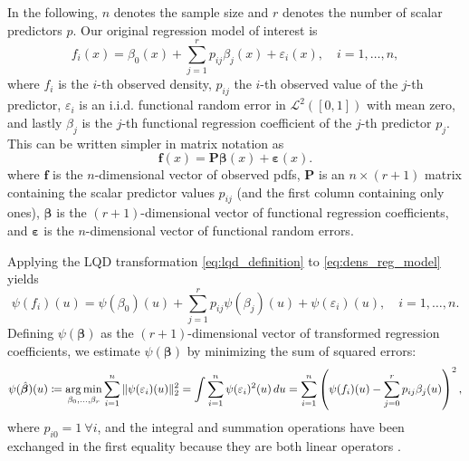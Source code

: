 In the following, $n$ denotes the sample size and $r$ denotes the number of scalar
predictors $p$. Our original regression model of interest is
\begin{equation}
    \label{eq:dens_reg_model}
    f_i(x) = \beta_0(x) + \sum_{j=1}^{r} p_{ij} \beta_j(x) + \varepsilon_i(x), \quad i = 1, \ldots, n,
\end{equation}
where $f_i$ is the $i$-th observed density, $p_{ij}$ the $i$-th observed value of the
$j$-th predictor, $\varepsilon_i$ is an i.i.d. functional random error in $\mathcal{L}^2([0,1])$
with mean zero, and lastly $\beta_j$ is the $j$-th functional regression coefficient of the $j$-th
predictor $p_j$. This can be written simpler in matrix notation as
\begin{equation}
    \label{eq:dens_reg_model_matrix}
    \mathbf{f}(x) = \mathbf{P} \boldsymbol{\beta}(x) + \boldsymbol{\varepsilon}(x).
\end{equation}
where $\mathbf{f}$ is the $n$-dimensional vector of observed pdfs, $\mathbf{P}$ is an $n \times (r+1)$
matrix containing the scalar predictor values $p_{ij}$ (and the first column containing only
ones), $\boldsymbol{\beta}$ is the $(r+1)$-dimensional vector of functional regression coefficients,
and $\boldsymbol{\varepsilon}$ is the $n$-dimensional vector of functional random errors.

Applying the LQD transformation \eqref{eq:lqd_definition} to \eqref{eq:dens_reg_model}
yields
\begin{equation}
    \label{eq:lqd_reg_model}
    \psi(f_i)(u) = \psi(\beta_0)(u) + \sum_{j=1}^{r} p_{ij} \psi(\beta_j)(u) + \psi(\varepsilon_i)(u), \quad i = 1, \ldots, n.
\end{equation}
Defining $\psi(\boldsymbol{\beta})$ as the $(r+1)$-dimensional vector of transformed
regression coefficients, we estimate $\psi(\boldsymbol{\beta})$ by minimizing the sum of
squared errors:
\begin{equation}
    \psi(\hat{\boldsymbol{\beta}})(u)
    \coloneqq \operatorname*{arg\,min}_{\beta_0,\dots, \beta_r} \sum_{i=1}^{n} \|\psi(\varepsilon_i) (u)\|_2^2
    = \int \sum_{i=1}^{n} \psi(\varepsilon_i)^2 (u) \, du
    = \sum_{i=1}^{n} \left( \psi(f_i)(u) - \sum_{j=0}^{r} p_{ij} \beta_j(u) \right)^2,
\end{equation}
where $p_{i0} = 1 \ \forall i$, and the integral and summation operations have been
exchanged in the first equality because they are both linear operators
\parencites[cf.][Chapter~13.4]{RamsaySilverman2005}[][Chapter~5.1]{KokoszkaReimherr2017}.

